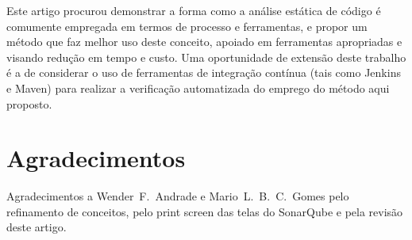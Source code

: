 \documentclass[12pt,journal,compsoc]{IEEEtran}
\begin{document}
Este artigo procurou demonstrar a forma como a análise estática de código é comumente empregada em termos de processo e ferramentas, e propor um método que faz melhor uso deste conceito, apoiado em  ferramentas apropriadas e visando redução em tempo e custo. Uma oportunidade de extensão deste trabalho é a de considerar o uso de ferramentas de integração contínua (tais como Jenkins\cite{jenkins} e Maven\cite{maven}) para realizar a verificação automatizada do emprego do método aqui proposto.

\section*{Agradecimentos}

Agradecimentos a Wender~F.~Andrade e Mario~L.~B.~C.~Gomes pelo refinamento de conceitos, pelo print screen das telas do SonarQube e pela revisão deste artigo.




\end{document}
